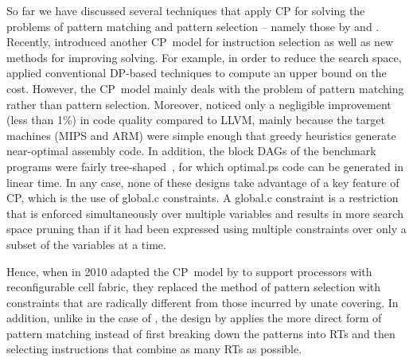 So far we have discussed several techniques that apply \glsdesc{CP} for solving
the problems of \gls{pattern matching} and \gls{pattern selection} -- namely
those by \citeauthor{BashfordLeupers:1999} and \citeauthor{MartinEtAl:2009}.
%
Recently, \textcite{Beg:2013} introduced another \gls{CP}~model for
\gls{instruction selection} as well as new methods for improving solving.
%
For example, in order to reduce the search space, \citeauthor{Beg:2013} applied
conventional \gls{DP}-based techniques to compute an upper bound on the cost.
%
However, the \gls{CP}~model mainly deals with the problem of \gls{pattern
  matching} rather than \gls{pattern selection}.
%
Moreover, \citeauthor{Beg:2013} noticed only a negligible improvement (less than
1\%) in code quality compared to \gls{LLVM}, mainly because the \glspl{target
  machine} (\gls{MIPS} and \gls{ARM}) were simple enough that greedy heuristics
generate near-optimal \gls{assembly code}.  In addition, the \glspl{block DAG}
of the benchmark \glspl{program} were fairly
\gls{tree}-shaped~\cite{VanBeek:2014}, for which \gls{optimal.ps} code can be
generated in linear time.
%
In any case, none of these designs take advantage of a key feature of
\glsdesc{CP}, which is the use of \gls{global.c} \glspl{constraint}.
%
A \gls{global.c} \gls{constraint} is a restriction that is enforced
simultaneously over multiple \glspl{variable} and results in more search space
pruning than if it had been expressed using multiple \glspl{constraint} over
only a subset of the variables at a time.

Hence, when \textcite{FlochEtAl:2010} in 2010 adapted the \gls{CP}~model by
\citeauthor{MartinEtAl:2009} to support processors with reconfigurable cell fabric,
they replaced the method of \gls{pattern selection} with \glspl{constraint} that
are radically different from those incurred by \gls{unate covering}.
%
In addition, unlike in the case of \citeauthor{BashfordLeupers:1999}, the design by
\citeauthor{FlochEtAl:2010} applies the more direct form of \gls{pattern matching}
instead of first breaking down the \glspl{pattern} into \glspl{RT} and then
selecting \glspl{instruction} that combine as many \glspl{RT} as possible.

